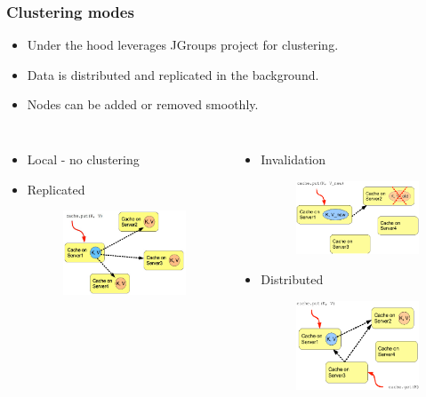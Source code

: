 \documentclass[10pt,utf8]{beamer}
\begin{document}
\begin{frame}
	\frametitle{Clustering modes}
	\begin{itemize}
		\item Under the hood leverages JGroups project for clustering.
		\item Data is distributed and replicated in the background.
		\item Nodes can be added or removed smoothly.
	\end{itemize}
	\vspace{-0.1cm}
	
	 {
	\begin{columns}
		\begin{itemize}
			\item Local - no clustering
			\vspace{2.9cm}
			\item Replicated
			\begin{figure}
				\includegraphics[width=4cm]{./img/ispn-repl.eps}
			\end{figure}
		\end{itemize}
		\begin{itemize}
			\item Invalidation
			\begin{figure}
				\includegraphics[width=4cm]{./img/ispn-inval.eps}
			\end{figure}
			\vspace{-0.1cm}
			\item Distributed
			\begin{figure}
				\includegraphics[width=4cm]{./img/ispn-dist.eps}
			\end{figure}
		\end{itemize}
	\end{columns}
	}
\end{frame}
\end{document}
